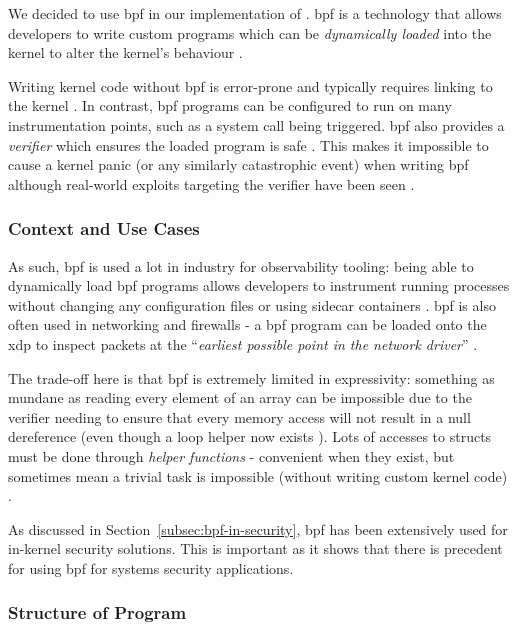 We decided to use \ac{bpf} in our implementation of \af. \ac{bpf} is a technology
that allows developers to write custom programs which can be \textit{dynamically
loaded} into the kernel to alter the kernel's behaviour \cite{LEARNING_EBPF}.

Writing kernel code without \ac{bpf} is error-prone and typically
requires linking to the kernel \cite{UNDERSTANDING_LINUX_KERNEL}. In contrast,
\ac{bpf} programs can be configured to run on many instrumentation points, such
as a system call being triggered. \ac{bpf} also provides a \textit{verifier} which
ensures the  loaded program is safe \cite{LEARNING_EBPF}. This makes it
impossible to cause a kernel panic (or any similarly catastrophic event) when
writing \ac{bpf} although real-world exploits targeting the verifier have
been seen \cite{BPF_VERIFIER_EXPLOIT}.  

\subsubsection{Context and Use Cases}

As such, \ac{bpf} is used a lot in industry for observability tooling: being able to
dynamically load \ac{bpf} programs allows developers to instrument running processes
without changing any configuration files or using sidecar containers \cite{SIDECAR}.
\ac{bpf} is also often used in networking and firewalls 
\cite{LINUX_NETWORKING_OBSERVABILITY} - a \ac{bpf} program can be loaded 
onto the \ac{xdp} to inspect packets at the 
``\textit{earliest possible point in the network driver}'' 
\cite{CILIUM_BPF_XDP_INTRO}. 

The trade-off here is that \ac{bpf} is extremely limited in expressivity:
something as mundane as reading every element of an array can be impossible due
to the verifier needing to ensure that every memory access will not result in 
a null dereference (even though a loop helper now exists 
\cite{BPF_LOOP_COMMIT}). Lots of accesses to structs must be done through 
\textit{helper functions} - convenient when they exist, but sometimes mean a trivial
task is impossible (without writing custom kernel code) \cite{bpf_kfuncs_docs}. 

As discussed in Section~\ref{subsec:bpf-in-security}, \ac{bpf} has been
extensively used for in-kernel security solutions. This is important as it shows
that there is precedent for using \ac{bpf} for systems security applications.

\subsubsection{Structure of  Program}

